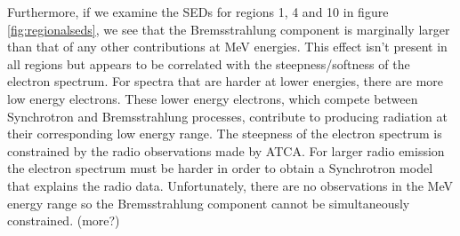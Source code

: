 \documentclass[12pt,a4paper]{article}
\begin{document}
Furthermore, if we examine the SEDs for regions 1, 4 and 10 in figure \ref{fig:regionalseds}, we see that the Bremsstrahlung component is marginally larger than that of any other contributions at MeV energies. This effect isn't present in all regions but appears to be correlated with the steepness/softness of the electron spectrum. For spectra that are harder at lower energies, there are more low energy electrons. These lower energy electrons, which compete between Synchrotron and Bremsstrahlung processes, contribute to producing radiation at their corresponding low energy range. The steepness of the electron spectrum is constrained by the radio observations made by ATCA. For larger radio emission the electron spectrum must be harder in order to obtain a Synchrotron model that explains the radio data. Unfortunately, there are no observations in the MeV energy range so the Bremsstrahlung component cannot be simultaneously constrained. (more?)
\end{document}
